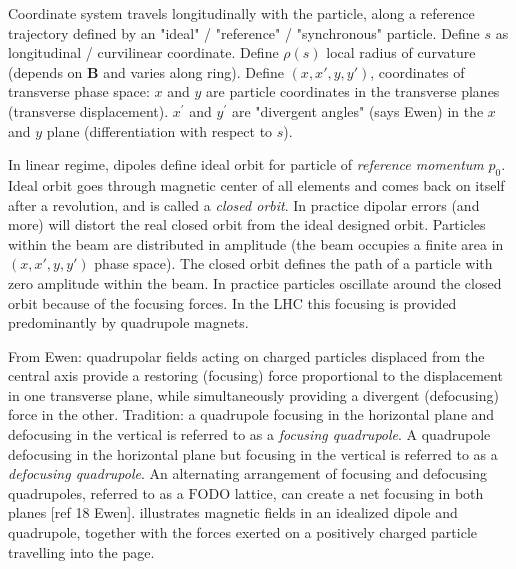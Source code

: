 Coordinate system travels longitudinally with the particle, along a reference trajectory defined by an "ideal" / "reference" / "synchronous" particle.
Define $s$ as longitudinal / curvilinear coordinate.
Define $\rho(s)$ local radius of curvature (depends on $\mathbf{B}$ and varies along ring).
Define $(x, x\prime, y, y\prime)$, coordinates of transverse phase space:
$x$ and $y$ are particle coordinates in the transverse planes (transverse displacement).
$x^{'}$ and $y^{'}$ are "divergent angles" (says Ewen) in the $x$ and $y$ plane (differentiation with respect to $s$).
\bigbreak

In linear regime, dipoles define ideal orbit for particle of \emph{reference momentum} $p_0$.
Ideal orbit goes through magnetic center of all elements and comes back on itself after a revolution, and is called a \emph{closed orbit}.
In practice dipolar errors (and more) will distort the real closed orbit from the ideal designed orbit.
Particles within the beam are distributed in amplitude (the beam occupies a finite area in $(x, x\prime, y, y\prime)$ phase space). 
The closed orbit defines the path of a particle with zero amplitude within the beam.
In practice particles oscillate around the closed orbit because of the focusing forces. 
In the LHC this focusing is provided predominantly by quadrupole magnets.
\bigbreak

From Ewen: quadrupolar fields acting on charged particles displaced from the central axis provide a restoring (focusing) force proportional to the displacement in one transverse plane, while simultaneously providing a divergent (defocusing) force in the other. 
Tradition: a quadrupole focusing in the horizontal plane and defocusing in the vertical is referred to as a \emph{focusing quadrupole}. 
A quadrupole defocusing in the horizontal plane but focusing in the vertical is referred to as a \emph{defocusing quadrupole}.
An alternating arrangement of focusing and defocusing quadrupoles, referred to as a $\mathrm{FODO}$ lattice, can create a net focusing in both planes [ref 18 Ewen]. 
 illustrates magnetic fields in an idealized dipole and quadrupole, together with the forces exerted on a positively charged particle travelling into the page.
\bigbreak

